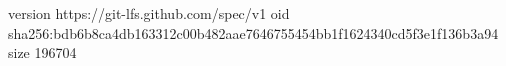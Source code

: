 version https://git-lfs.github.com/spec/v1
oid sha256:bdb6b8ca4db163312c00b482aae7646755454bb1f1624340cd5f3e1f136b3a94
size 196704
